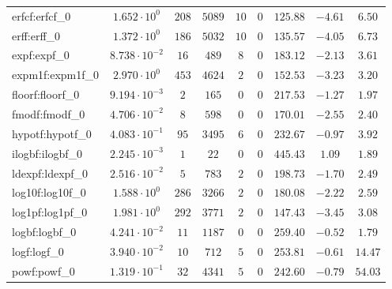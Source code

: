 \begin{tabular}{|l|c|c|c|c|c|c|c|c|}
erfcf:erfcf\_0               & $ 1.652 \cdot 10^{0}  $ & $ 208    $ & $ 5089   $ & $ 10  $ & $ 0   $ & $ 125.88      $ & $ -4.61   $ & $ 6.50    $ \\
erff:erff\_0                 & $ 1.372 \cdot 10^{0}  $ & $ 186    $ & $ 5032   $ & $ 10  $ & $ 0   $ & $ 135.57      $ & $ -4.05   $ & $ 6.73    $ \\
expf:expf\_0                 & $ 8.738 \cdot 10^{-2} $ & $ 16     $ & $ 489    $ & $ 8   $ & $ 0   $ & $ 183.12      $ & $ -2.13   $ & $ 3.61    $ \\
expm1f:expm1f\_0             & $ 2.970 \cdot 10^{0}  $ & $ 453    $ & $ 4624   $ & $ 2   $ & $ 0   $ & $ 152.53      $ & $ -3.23   $ & $ 3.20    $ \\
floorf:floorf\_0             & $ 9.194 \cdot 10^{-3} $ & $ 2      $ & $ 165    $ & $ 0   $ & $ 0   $ & $ 217.53      $ & $ -1.27   $ & $ 1.97    $ \\
fmodf:fmodf\_0               & $ 4.706 \cdot 10^{-2} $ & $ 8      $ & $ 598    $ & $ 0   $ & $ 0   $ & $ 170.01      $ & $ -2.55   $ & $ 2.40    $ \\
hypotf:hypotf\_0             & $ 4.083 \cdot 10^{-1} $ & $ 95     $ & $ 3495   $ & $ 6   $ & $ 0   $ & $ 232.67      $ & $ -0.97   $ & $ 3.92    $ \\
ilogbf:ilogbf\_0             & $ 2.245 \cdot 10^{-3} $ & $ 1      $ & $ 22     $ & $ 0   $ & $ 0   $ & $ 445.43      $ & $ 1.09    $ & $ 1.89    $ \\
ldexpf:ldexpf\_0             & $ 2.516 \cdot 10^{-2} $ & $ 5      $ & $ 783    $ & $ 2   $ & $ 0   $ & $ 198.73      $ & $ -1.70   $ & $ 2.49    $ \\
log10f:log10f\_0             & $ 1.588 \cdot 10^{0}  $ & $ 286    $ & $ 3266   $ & $ 2   $ & $ 0   $ & $ 180.08      $ & $ -2.22   $ & $ 2.59    $ \\
log1pf:log1pf\_0             & $ 1.981 \cdot 10^{0}  $ & $ 292    $ & $ 3771   $ & $ 2   $ & $ 0   $ & $ 147.43      $ & $ -3.45   $ & $ 3.08    $ \\
logbf:logbf\_0               & $ 4.241 \cdot 10^{-2} $ & $ 11     $ & $ 1187   $ & $ 0   $ & $ 0   $ & $ 259.40      $ & $ -0.52   $ & $ 1.79    $ \\
logf:logf\_0                 & $ 3.940 \cdot 10^{-2} $ & $ 10     $ & $ 712    $ & $ 5   $ & $ 0   $ & $ 253.81      $ & $ -0.61   $ & $ 14.47   $ \\
powf:powf\_0                 & $ 1.319 \cdot 10^{-1} $ & $ 32     $ & $ 4341   $ & $ 5   $ & $ 0   $ & $ 242.60      $ & $ -0.79   $ & $ 54.03   $ \\

\end{tabular}
